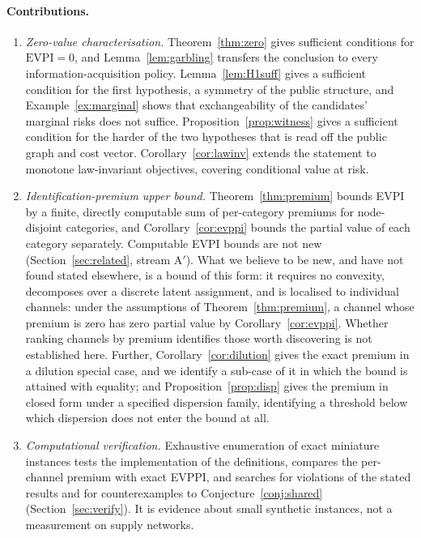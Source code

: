 \documentclass[pdflatex,sn-mathphys-num]{sn-jnl}
\theoremstyle{thmstyleone}
\theoremstyle{thmstyletwo}
\theoremstyle{thmstylethree}
\newcommand{\evpi}{\mathrm{EVPI}}
\begin{document}
\paragraph{Contributions.}
\begin{enumerate}
\item \emph{Zero-value characterisation.} Theorem~\ref{thm:zero} gives
sufficient conditions for $\evpi=0$, and Lemma~\ref{lem:garbling} transfers
the conclusion to every information-acquisition policy.
Lemma~\ref{lem:H1suff} gives a sufficient condition for the first
hypothesis, a symmetry of the public structure, and
Example~\ref{ex:marginal} shows that exchangeability of the candidates'
marginal risks does not suffice. Proposition~\ref{prop:witness} gives a
sufficient condition for the harder of the two hypotheses that is read off
the public graph and cost vector.
Corollary~\ref{cor:lawinv} extends the statement to monotone law-invariant
objectives, covering conditional value at risk.
\item \emph{Identification-premium upper bound.} Theorem~\ref{thm:premium}
bounds EVPI by a finite, directly computable sum of per-category premiums
for node-disjoint categories, and Corollary~\ref{cor:evppi} bounds the
partial value of each category separately. Computable EVPI bounds are not new
(Section~\ref{sec:related}, stream A$'$). What we believe to be new, and have
not found stated elsewhere, is a bound of this form: it requires no convexity,
decomposes over a discrete latent assignment, and is localised to individual
channels: under the assumptions of Theorem~\ref{thm:premium}, a channel
whose premium is zero has zero partial value by Corollary~\ref{cor:evppi}.
Whether ranking channels by premium identifies those worth discovering is
not established here.
Further, Corollary~\ref{cor:dilution} gives the exact
premium in a dilution special case, and we identify a sub-case of it in
which the bound is attained with equality; and
Proposition~\ref{prop:disp} gives the premium in closed form under a
specified dispersion family, identifying a threshold below which dispersion
does not enter the bound at all.
\item \emph{Computational verification.} Exhaustive enumeration of exact
miniature instances tests the implementation of the definitions, compares
the per-channel premium with exact EVPPI, and searches for violations of the
stated results and for counterexamples to Conjecture~\ref{conj:shared}
(Section~\ref{sec:verify}). It is evidence about small synthetic instances,
not a measurement on supply networks.
\end{enumerate}
\end{document}
